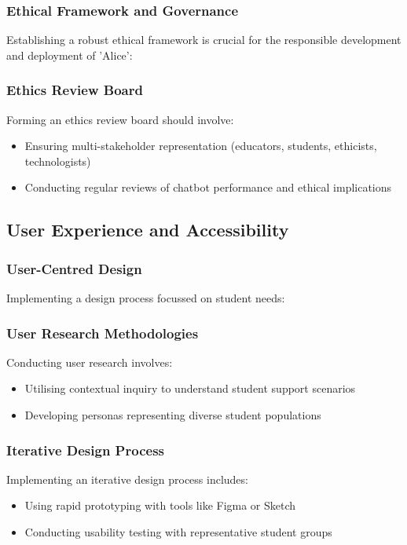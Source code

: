 \documentclass[14pt,a4paper]{article}
\begin{document}
\begin{multicols}{2}
\subsubsection{Ethical Framework and Governance}
Establishing a robust ethical framework is crucial for the responsible development and deployment of 'Alice':

\subsubsection*{Ethics Review Board}
Forming an ethics review board \textit{\parencite{UNESCO2023}} should involve:
\begin{itemize}
    \item Ensuring multi-stakeholder representation (educators, students, ethicists, technologists)
    \item Conducting regular reviews of chatbot performance and ethical implications
\end{itemize}


\subsection{User Experience and Accessibility}
\subsubsection{User-Centred Design}
Implementing a design process focussed on student needs:

\subsubsection{User Research Methodologies}
Conducting user research \textit{\parencite[pp. 50-100]{Goodman2023}} involves:
\begin{itemize}
    \item Utilising contextual inquiry to understand student support scenarios
    \item Developing personas representing diverse student populations
\end{itemize}

\subsubsection{Iterative Design Process}
Implementing an iterative design process \textit{\parencite[pp. 30-60]{HoltzblattBeyer2024}} includes:
\begin{itemize}
    \item Using rapid prototyping with tools like Figma or Sketch
    \item Conducting usability testing with representative student groups
\end{itemize}


\end{multicols}
\end{document}
